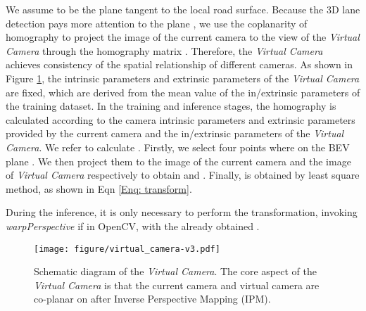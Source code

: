 \documentclass[10pt,twocolumn,letterpaper]{article}
\begin{document}
We assume  to be the plane tangent to the local road surface. Because the 3D lane detection pays more attention to the plane , we use the coplanarity of homography to project the image of the current camera to the view of the \textit{Virtual Camera} through the homography matrix . Therefore, the \textit{Virtual Camera} achieves consistency of the spatial relationship of different cameras.
As shown in Figure \ref{fig:virtual}, the intrinsic parameters  and extrinsic parameters  of the \textit{Virtual Camera} are fixed, which are derived from the mean value of the in/extrinsic parameters of the training dataset. In the training and inference stages, the homography  is calculated according to the camera intrinsic parameters  and extrinsic parameters  provided by the current camera and the in/extrinsic parameters of the \textit{Virtual Camera}. We refer \cite{homographies} to calculate  .  Firstly, we select four points  where  on the BEV plane . We then project them to the image of the current camera and the image of \textit{Virtual Camera} respectively to obtain  and . Finally,  is obtained by least square method, as shown in Eqn \ref{Enq: transform}.


During the inference, it is only necessary to perform the transformation, invoking \textit{warpPerspective} if in OpenCV, with the already obtained . 

\begin{figure}
    \centering
\texttt{[image: figure/virtual\_camera-v3.pdf]}
\caption{Schematic diagram of the \textit{Virtual Camera}. The core aspect of the \textit{Virtual Camera} is that the current camera and virtual camera are co-planar on  after Inverse Perspective Mapping (IPM).}
    \label{fig:virtual}
\end{figure}
\end{document}
